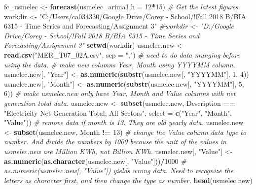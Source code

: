 \documentclass[]{article}
\newenvironment{Shaded}{\begin{snugshade}}{\end{snugshade}}
\newcommand{\KeywordTok}[1]{\textcolor[rgb]{0.13,0.29,0.53}{\textbf{#1}}}
\newcommand{\DataTypeTok}[1]{\textcolor[rgb]{0.13,0.29,0.53}{#1}}
\newcommand{\DecValTok}[1]{\textcolor[rgb]{0.00,0.00,0.81}{#1}}
\newcommand{\StringTok}[1]{\textcolor[rgb]{0.31,0.60,0.02}{#1}}
\newcommand{\CommentTok}[1]{\textcolor[rgb]{0.56,0.35,0.01}{\textit{#1}}}
\newcommand{\OperatorTok}[1]{\textcolor[rgb]{0.81,0.36,0.00}{\textbf{#1}}}
\newcommand{\NormalTok}[1]{#1}
\begin{document}
\begin{Shaded}
\begin{Highlighting}[]
\NormalTok{fc_usmelec <-}\StringTok{ }\KeywordTok{forecast}\NormalTok{(usmelec_arima1,}\DataTypeTok{h =} \DecValTok{12}\OperatorTok{*}\DecValTok{15}\NormalTok{)}
\CommentTok{# Get the latest figures.}
\NormalTok{workdir <-}\StringTok{ "C:/Users/ca034330/Google Drive/Corey - School/!Fall 2018 B/BIA 6315 - Time Series and Forecasting/Assignment 3"}
\CommentTok{#workdir <- "D:/Google Drive/Corey - School/!Fall 2018 B/BIA 6315 - Time Series and Forecasting/Assignment 3"}
\KeywordTok{setwd}\NormalTok{(workdir)}
\NormalTok{usmelec.new <-}\StringTok{ }\KeywordTok{read.csv}\NormalTok{(}\StringTok{"MER_T07_02A.csv"}\NormalTok{, }\DataTypeTok{sep =} \StringTok{","}\NormalTok{)}
\CommentTok{# need to do data munging before using the data.}
\CommentTok{# make new columns Year, Month using YYYYMM column.}
\NormalTok{usmelec.new[, }\StringTok{"Year"}\NormalTok{] <-}\StringTok{ }\KeywordTok{as.numeric}\NormalTok{(}\KeywordTok{substr}\NormalTok{(usmelec.new[, }\StringTok{"YYYYMM"}\NormalTok{], }\DecValTok{1}\NormalTok{, }\DecValTok{4}\NormalTok{))}
\NormalTok{usmelec.new[, }\StringTok{"Month"}\NormalTok{] <-}\StringTok{ }\KeywordTok{as.numeric}\NormalTok{(}\KeywordTok{substr}\NormalTok{(usmelec.new[, }\StringTok{"YYYYMM"}\NormalTok{], }\DecValTok{5}\NormalTok{, }\DecValTok{6}\NormalTok{))}
\CommentTok{# make usmelec.new only have Year, Month and Value columns with net generation total data.}
\NormalTok{usmelec.new <-}\StringTok{ }\KeywordTok{subset}\NormalTok{(usmelec.new, Description }\OperatorTok{==}\StringTok{ "Electricity Net Generation Total, All Sectors"}\NormalTok{, }\DataTypeTok{select =} \KeywordTok{c}\NormalTok{(}\StringTok{"Year"}\NormalTok{, }\StringTok{"Month"}\NormalTok{, }\StringTok{"Value"}\NormalTok{))}
\CommentTok{# remove data if month is 13. They are old yearly data.}
\NormalTok{usmelec.new <-}\StringTok{ }\KeywordTok{subset}\NormalTok{(usmelec.new, Month }\OperatorTok{!=}\StringTok{ }\DecValTok{13}\NormalTok{)}
\CommentTok{# change the Value column data type to number. And divide the numbers by 1000 because the unit of the values in usmelec.new are Million KWh, not Billion KWh.}
\NormalTok{usmelec.new[, }\StringTok{"Value"}\NormalTok{] <-}\StringTok{ }\KeywordTok{as.numeric}\NormalTok{(}\KeywordTok{as.character}\NormalTok{(usmelec.new[, }\StringTok{"Value"}\NormalTok{]))}\OperatorTok{/}\DecValTok{1000}
\CommentTok{# as.numeric(usmelec.new[, "Value"]) yields wrong data. Need to recognize the letters as character first, and then change the type as number. }
\KeywordTok{head}\NormalTok{(usmelec.new)}
\end{Highlighting}
\end{Shaded}
\end{document}
